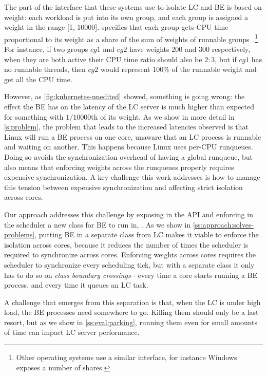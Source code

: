 The part of the \cgroups{} interface that these systems use to isolate LC and BE
is based on weight: each workload is put into its own group, and each group is
assigned a weight in the range [1, 10000]. \cgroups{} specifies that each group
gets CPU time proportional to its weight as a share of the sum of weights of
runnable groups~\cite{cgroups-kerneldocs}.\footnote{Other operating systems use
a similar interface, for instance Windows exposes a number of shares.} For
instance, if two groups $cg1$ and $cg2$ have weights 200 and 300 respectively,
when they are both active their CPU time ratio should also be $2:3$, but if
$cg1$ has no runnable threads, then $cg2$ would represent 100\% of the runnable
weight and get all the CPU time.

However, as \autoref{fig:kubernetes-unedited} showed, something is going wrong:
the effect the BE has on the latency of the LC server is much higher than
expected for something with $1/10000$th of its weight. As we show in more detail
in \autoref{s:problem}, the problem that leads to the increased latencies
observed is that Linux will run a BE process on one core, unaware that an LC
process is runnable and waiting on another. This happens because Linux uses
per-CPU runqueues. Doing so avoids the synchronization overhead of having a
global runqueue, but also means that enforcing weights across the runqueues
properly requires expensive synchronization. A key challenge this work addresses
is how to manage this tension between expensive synchronization and affecting
strict isolation across cores.

Our approach addresses this challenge by exposing in the API and enforcing in
the scheduler a new class for BE to run in, \beclass{}. As we show in
\autoref{ss:approach:solves-problems}, putting BE in a separate class from LC
makes it viable to enforce the isolation across cores, because it reduces the
number of times the scheduler is required to synchronize across cores. Enforcing
weights across cores requires the scheduler to synchronize every scheduling
tick, but with a separate class it only has to do so on \textit{class boundary
crossings} - every time a core starts running a BE process, and every time it
queues an LC task.

A challenge that emerges from this separation is that, when the LC is under high
load, the BE processes need somewhere to go. Killing them should only be a last
resort, but as we show in \autoref{ss:eval:parking}, running them even for small
amounts of time can impact LC server performance.

